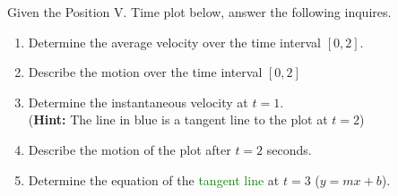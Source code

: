 \documentclass[12pt]{article} %
\newcommand{\tx}[1]{\text{#1}}
\begin{document}
 \begin{qstn}[5]
    Given the Position V. Time plot below, answer the following inquires.
    \begin{center}
    \end{center}

    \begin{enumerate}[label = (\alph*)]
        \item Determine the average velocity over the time interval $[0,2]$.
        \item Describe the motion over the time interval $[0,2]$
        \item Determine the instantaneous velocity at $t = 1$.\\
        (\textbf{Hint:} The line in blue is a tangent line to the plot at $t = 2$)
        \item Describe the motion of the plot after $t = 2$ seconds.
        \item Determine the equation of the \textcolor{green}{tangent line} at $t = 3$ ($y = mx + b$).
    \end{enumerate}


\end{qstn}
\end{document}
